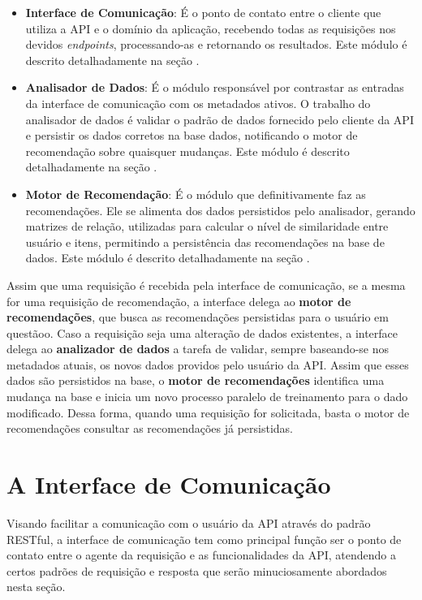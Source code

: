 \documentclass[12pt, openright, oneside, a4paper, brazil]{abntex2}
\begin{document}
\begin{itemize}

	\item \textbf{Interface de Comunicação}: É o ponto de contato entre o cliente que utiliza a API e o domínio da aplicação, recebendo todas as requisições nos devidos \textit{endpoints}, processando-as e retornando os resultados. Este módulo é descrito detalhadamente na seção .

	\item \textbf{Analisador de Dados}: É o módulo responsável por contrastar as entradas da interface de comunicação com os metadados ativos. O trabalho do analisador de dados é validar o padrão de dados fornecido pelo cliente da API e persistir os dados corretos na base dados, notificando o motor de recomendação sobre quaisquer mudanças. Este módulo é descrito detalhadamente na seção .

	\item \textbf{Motor de Recomendação}: É o módulo que definitivamente faz as recomendações. Ele se alimenta dos dados persistidos pelo analisador, gerando matrizes de relação, utilizadas para calcular o nível de similaridade entre usuário e itens, permitindo a persistência das recomendações na base de dados. Este módulo é descrito detalhadamente na seção .

\end{itemize}

Assim que uma requisição é recebida pela interface de comunicação, se a mesma for uma requisição de recomendação, a interface delega ao \textbf{motor de recomendações}, que busca as recomendações persistidas para o usuário em questãoo. Caso a requisição seja uma alteração de dados existentes, a interface delega ao \textbf{analizador de dados} a tarefa de validar, sempre baseando-se nos metadados atuais, os novos dados providos pelo usuário da API. Assim que esses dados são persistidos na base, o \textbf{motor de recomendações} identifica uma mudança na base e inicia um novo processo paralelo de treinamento para o dado modificado. Dessa forma, quando uma requisição for solicitada, basta o motor de recomendações consultar as recomendações já persistidas.

\section{A Interface de Comunicação} \label{interface}

Visando facilitar a comunicação com o usuário da API através do padrão RESTful, a interface de comunicação tem como principal função ser o ponto de contato entre o agente da requisição e as funcionalidades da API, atendendo a certos padrões de requisição e resposta que serão minuciosamente abordados nesta seção.
\end{document}
